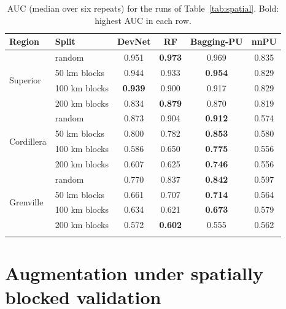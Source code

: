\documentclass[pdflatex,sn-apa]{sn-jnl}
\begin{document}
\begin{appendices}
\begin{table}[!h]
\caption{AUC (median over six repeats) for the runs of Table~\ref{tab:spatial}. Bold: highest AUC in each row.}\label{tab:spatial-auc}
\footnotesize
\setlength{\tabcolsep}{3pt}
\begin{tabular*}{\textwidth}{@{\extracolsep\fill}llcccc}
\toprule
Region & Split & DevNet & RF & Bagging-PU & nnPU \\
\midrule
\multirow{4}{*}{Superior} & random & 0.951 & \textbf{0.973} & 0.969 & 0.835 \\
 & 50 km blocks & 0.944 & 0.933 & \textbf{0.954} & 0.829 \\
 & 100 km blocks & \textbf{0.939} & 0.900 & 0.917 & 0.829 \\
 & 200 km blocks & 0.834 & \textbf{0.879} & 0.870 & 0.819 \\
\midrule
\multirow{4}{*}{Cordillera} & random & 0.873 & 0.904 & \textbf{0.912} & 0.574 \\
 & 50 km blocks & 0.800 & 0.782 & \textbf{0.853} & 0.580 \\
 & 100 km blocks & 0.586 & 0.650 & \textbf{0.775} & 0.556 \\
 & 200 km blocks & 0.607 & 0.625 & \textbf{0.746} & 0.556 \\
\midrule
\multirow{4}{*}{Grenville} & random & 0.770 & 0.837 & \textbf{0.842} & 0.597 \\
 & 50 km blocks & 0.661 & 0.707 & \textbf{0.714} & 0.564 \\
 & 100 km blocks & 0.634 & 0.621 & \textbf{0.673} & 0.579 \\
 & 200 km blocks & 0.572 & \textbf{0.602} & 0.555 & 0.562 \\
\botrule
\end{tabular*}
\end{table}

\section{Augmentation under spatially blocked validation}\label{app:aug-spatial}


\end{appendices}
\end{document}
